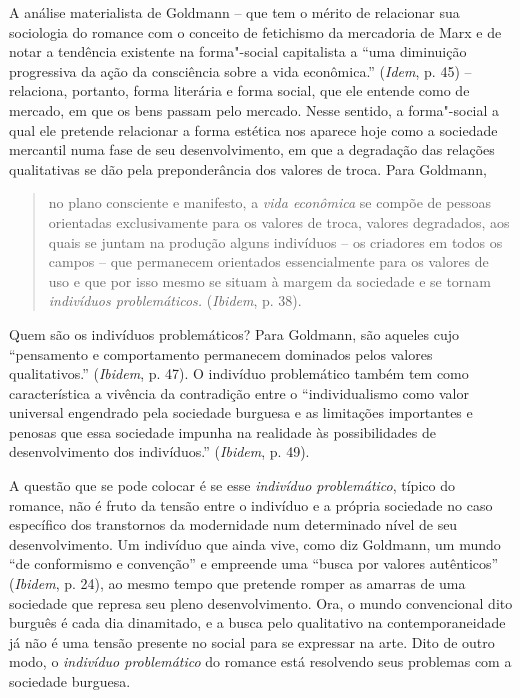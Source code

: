 {A análise materialista de Goldmann -- que tem o mérito de relacionar sua
sociologia do romance com o conceito de fetichismo da mercadoria de Marx
e de notar a tendência existente na forma"-social capitalista a ``uma
diminuição progressiva da ação da consciência sobre a vida econômica.''
(\emph{Idem}, p. 45) -- relaciona, portanto, forma literária e forma
social, que ele entende como de mercado, em que os bens passam pelo
mercado. Nesse sentido, a forma"-social a qual ele pretende relacionar a
forma estética nos aparece hoje como a sociedade mercantil numa fase de
seu desenvolvimento, em que a degradação das relações qualitativas se
dão pela preponderância dos valores de troca. Para Goldmann,

\begin{quote}
no plano consciente e manifesto, a \emph{vida econômica} se compõe de
pessoas orientadas exclusivamente para os valores de troca, valores
degradados, aos quais se juntam na produção alguns indivíduos -- os
criadores em todos os campos -- que permanecem orientados essencialmente
para os valores de uso e que por isso mesmo se situam à margem da
sociedade e se tornam \emph{indivíduos problemáticos.} (\emph{Ibidem},
p. 38).
\end{quote}

Quem são os indivíduos problemáticos? Para Goldmann, são aqueles cujo
``pensamento e comportamento permanecem dominados pelos valores
qualitativos.'' (\emph{Ibidem}, p. 47). O indivíduo problemático também
tem como característica a vivência da contradição entre o
``individualismo como valor universal engendrado pela sociedade burguesa
e as limitações importantes e penosas que essa sociedade impunha na
realidade às possibilidades de desenvolvimento dos indivíduos.''
(\emph{Ibidem}, p. 49).

A questão que se pode colocar é se esse \emph{indivíduo problemático},
típico do romance, não é fruto da tensão entre o indivíduo e a própria
sociedade no caso específico dos transtornos da modernidade num
determinado nível de seu desenvolvimento. Um indivíduo que ainda vive,
como diz Goldmann, um mundo ``de conformismo e convenção'' e empreende
uma ``busca por valores autênticos'' (\emph{Ibidem}, p. 24), ao mesmo
tempo que pretende romper as amarras de uma sociedade que represa seu
pleno desenvolvimento. Ora, o mundo convencional dito burguês é cada dia
dinamitado, e a busca pelo qualitativo na contemporaneidade já não é uma
tensão presente no social para se expressar na arte. Dito de outro modo,
o \emph{indivíduo problemático} do romance está resolvendo seus
problemas com a sociedade burguesa.

}
